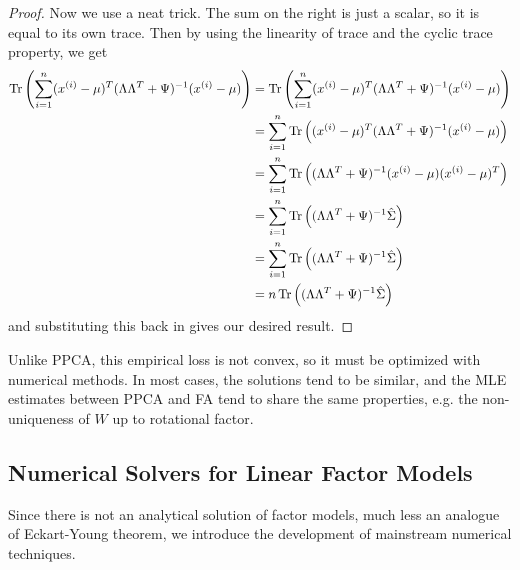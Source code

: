 \begin{proof}
    Now we use a neat trick. The sum on the right is just a scalar, so it is equal to its own trace. Then by using the linearity of trace and the cyclic trace property, we get 
    \begin{align}
      \Tr \left( \sum_{i=1}^n (x^{(i)} - \mu)^T (\Lambda \Lambda^T + \Psi)^{-1} (x^{(i)} - \mu) \right) 
      & = \Tr \left( \sum_{i=1}^n (x^{(i)} - \mu)^T (\Lambda \Lambda^T + \Psi)^{-1} (x^{(i)} - \mu) \right) \\ 
      & = \sum_{i=1}^n \Tr \left( (x^{(i)} - \mu)^T (\Lambda \Lambda^T + \Psi)^{-1} (x^{(i)} - \mu) \right) \\ 
      & = \sum_{i=1}^n \Tr \left( (\Lambda \Lambda^T + \Psi)^{-1} (x^{(i)} - \mu) (x^{(i)} - \mu)^T \right) \\ 
      & = \sum_{i=1}^n \Tr \left( (\Lambda \Lambda^T + \Psi)^{-1} \hat{\Sigma} \right) \\ 
      & = \sum_{i=1}^n \Tr \left( (\Lambda \Lambda^T + \Psi)^{-1} \hat{\Sigma} \right) \\ 
      & = n \Tr \left( (\Lambda \Lambda^T + \Psi)^{-1} \hat{\Sigma} \right)
    \end{align}
    and substituting this back in gives our desired result. 
  \end{proof}

  Unlike PPCA, this empirical loss is not convex, so it must be optimized with numerical methods. In most cases, the solutions tend to be similar, and the MLE estimates between PPCA and FA tend to share the same properties, e.g. the non-uniqueness of $W$ up to rotational factor. 

\subsection{Numerical Solvers for Linear Factor Models}
  
  Since there is not an analytical solution of factor models, much less an analogue of Eckart-Young theorem, we introduce the development of mainstream numerical techniques. 

